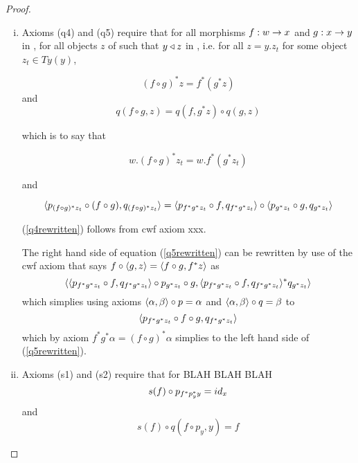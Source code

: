 \begin{proof}
\begin{enumerate}[(i)]
(\ref{q3rewritten})  simplies to
\begin{equation}
\tuple{p_{y_t},q_{y_t}}=id_{x.y_t}
\end{equation}
and this corresponds to cwf axiom xxx.  
\item
Axioms (q4) and (q5) require that 
for all morphisms $f:w \rightarrow x$ and $g:x \rightarrow y$ in \catcw, for all objects $z$ of \catcw such that $y \triangleleft z$ in , i.e. for all $z=y.z_t$ for some object
$z_t \in Ty(y)$,

\begin{equation}
(f \circ g)^*z =  f^* (g ^* z)
\end{equation} 
and
\begin{equation}
q(f \circ g,z) = q(f,g^*z) \circ q(g,z)
\end{equation}

which is to say that

\begin{equation}
w.(f \circ g)^*z_t =  w.f^* (g ^* z_t)  \label{q4rewritten}
\end{equation}

and 

\begin{equation}
\langle p_{(f \circ g)^*z_t} \circ (f \circ g),q_{(f \circ g)^*z_t}\rangle =  \langle p_{f^*g^*z_t} \circ f,q_{f^*g^*z_t}\rangle \circ \langle p_{g^*z_t} \circ g,q_{g^*z_t}\rangle \label{q5rewritten}
\end{equation}

(\ref{q4rewritten}) follows from cwf axiom xxx.

The right hand side of equation (\ref{q5rewritten}) can be rewritten by use of the cwf axiom that says $f \circ \langle g,z\rangle=\langle f\circ g,f^*z\rangle$ as
\begin{equation*}
\langle
    \langle p_{f^*g^*z_t} \circ f,q_{f^*g^*z_t}\rangle \circ p_{g^*z_t} \circ g,
		\langle p_{f^*g^*z_t} \circ f,q_{f^*g^*z_t}\rangle ^* q_{g^*z_t}
\rangle
\end{equation*} 
which simplies using axioms $\langle\alpha,\beta\rangle\circ p = \alpha$ and $\langle\alpha,\beta\rangle\circ q = \beta$
to 
\begin{equation*}
\langle
    p_{f^*g^*z_t} \circ f  \circ g,
		q_{f^*g^*z_t}
\rangle
\end{equation*}
which by axiom $f^*g^*\alpha=(f \circ g)^* \alpha$ simplies to the left hand side of (\ref{q5rewritten}).
\item
Axioms (s1) and (s2) require that for BLAH BLAH BLAH
\begin{equation}
s(f) \circ p_{f^* p_y ^* y}=id_x
\end{equation}
and
\begin{equation}
s(f) \circ q( f \circ p_y     ,y)=f
\end{equation}	



\end{enumerate}
\end{proof}
